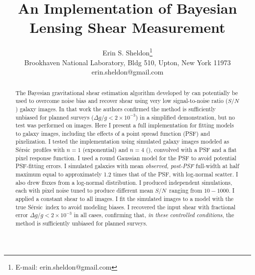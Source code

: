 \documentclass[usegraphicx,usenatbib]{mn2e}
\newcommand{\sn}{$S/N$}
\newcommand{\sersic}{S\'{e}rsic}
\begin{document}
\title{An Implementation of Bayesian Lensing Shear Measurement}

\author[Erin S. Sheldon]{Erin S. Sheldon\thanks{E-mail: erin.sheldon@gmail.com}\\
Brookhaven National Laboratory, Bldg 510, Upton, New York 11973\\
erin.sheldon@gmail.com}

\maketitle

\begin{abstract}

The Bayesian gravitational shear estimation algorithm developed by \cite{ba14}
can potentially be used to overcome noise bias and recover shear using very low
signal-to-noise ratio (\sn) galaxy images.  In that work the authors confirmed
the method is sufficiently unbiased for planned surveys ($\Delta g/g < 2 \times
10^{-3}$) in a simplified demonstration, but no test was performed on images.
Here I present a full implementation for fitting models to galaxy images,
including the effects of a point spread function (PSF) and pixelization.  I
tested the implementation using simulated galaxy images modeled as \sersic\
profiles with $n=1$ (exponential) and $n=4$ (\devauc), convolved with a PSF and
a flat pixel response function.  I used a round Gaussian model for the PSF to
avoid potential PSF-fitting errors. I simulated galaxies with mean {\em
observed, post-PSF} full-width at half maximum equal to approximately 1.2 times
that of the PSF, with log-normal scatter.  I also drew fluxes from a log-normal
distribution. I produced independent simulations, each with pixel noise tuned
to produce different mean \sn\ ranging from $10-1000$.  I applied a constant
shear to all images.  I fit the simulated images to a model with the true
\sersic\ index to avoid modeling biases.  I recovered the input shear with
fractional error $\Delta g/g < 2 \times 10^{-3}$ in all cases, confirming that,
{\em in these controlled conditions}, the method is sufficiently unbiased for
planned surveys.





\end{abstract}
\end{document}
